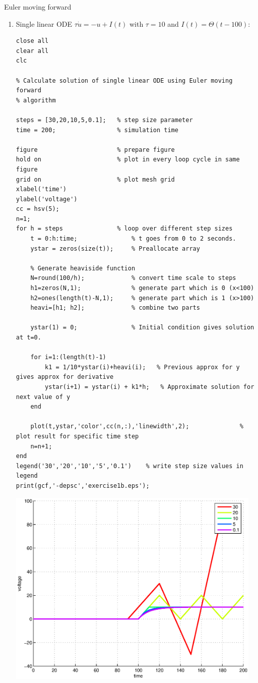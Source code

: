 \documentclass[12pt]{article}
\newenvironment{exercise}[2][Exercise]{\begin{trivlist}
\item[\hskip \labelsep {\bfseries #1}\hskip \labelsep {\bfseries #2.}]}{\end{trivlist}}
\begin{document}
\begin{exercise}{2.3}
Euler moving forward \\
\renewcommand{\labelenumi}{\alph{enumi})}
\begin{enumerate}
\item Single linear ODE $\tau \dot{u} = -u + I(t)$ with $\tau=10$ and $I(t)=\Theta(t-100)$:
\begin{tiny}
\begin{lstlisting}
close all
clear all
clc

% Calculate solution of single linear ODE using Euler moving forward
% algorithm

steps = [30,20,10,5,0.1];   % step size parameter
time = 200;                 % simulation time

figure                      % prepare figure
hold on                     % plot in every loop cycle in same figure
grid on                     % plot mesh grid
xlabel('time')
ylabel('voltage')
cc = hsv(5);
n=1;
for h = steps               % loop over different step sizes
    t = 0:h:time;               % t goes from 0 to 2 seconds.
    ystar = zeros(size(t));     % Preallocate array

    % Generate heaviside function
    N=round(100/h);             % convert time scale to steps
    h1=zeros(N,1);              % generate part which is 0 (x<100)
    h2=ones(length(t)-N,1);     % generate part which is 1 (x>100)
    heavi=[h1; h2];             % combine two parts

    ystar(1) = 0;               % Initial condition gives solution at t=0.
    
    for i=1:(length(t)-1)
        k1 = 1/10*ystar(i)+heavi(i);   % Previous approx for y gives approx for derivative
        ystar(i+1) = ystar(i) + k1*h;   % Approximate solution for next value of y
    end
    
    plot(t,ystar,'color',cc(n,:),'linewidth',2);              % plot result for specific time step
    n=n+1;
end
legend('30','20','10','5','0.1')    % write step size values in legend
print(gcf,'-depsc','exercise1b.eps');
\end{lstlisting}
\end{tiny}
\includegraphics[width=4.8in]{exercise1a.eps}


\end{enumerate}
\end{exercise}
\end{document}
